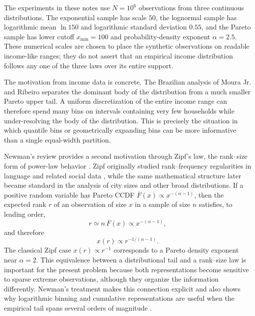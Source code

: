 \documentclass[12pt]{article}
\numberwithin{equation}{section}
\begin{document}
The experiments in these notes use $N=10^6$ observations from three continuous distributions. The exponential sample has scale $50$, the lognormal sample has logarithmic mean $\ln 150$ and logarithmic standard deviation $0.55$, and the Pareto sample has lower cutoff $x_{\min}=100$ and probability-density exponent $\alpha=2.5$. These numerical scales are chosen to place the synthetic observations on readable income-like ranges; they do not assert that an empirical income distribution follows any one of the three laws over its entire support.

The motivation from income data is concrete. The Brazilian analysis of Moura Jr. and Ribeiro \cite{MouraRibeiro2009} separates the dominant body of the distribution from a much smaller Pareto upper tail. A uniform discretization of the entire income range can therefore spend many bins on intervals containing very few households while under-resolving the body of the distribution. This is precisely the situation in which quantile bins or geometrically expanding bins can be more informative than a single equal-width partition.

Newman's review provides a second motivation through Zipf's law, the rank--size form of power-law behavior \cite{Newman2005}. Zipf originally studied rank--frequency regularities in language and related social data \cite{Zipf1949}, while the same mathematical structure later became standard in the analysis of city sizes and other broad distributions. If a positive random variable has Pareto CCDF $\overline F(x)\propto x^{-(\alpha-1)}$, then the expected rank $r$ of an observation of size $x$ in a sample of size $n$ satisfies, to leading order,
\begin{equation}
 r\simeq n\,\overline F(x)\propto x^{-(\alpha-1)},
\end{equation}
and therefore
\begin{equation}
 x(r)\propto r^{-1/(\alpha-1)}.
\end{equation}
The classical Zipf case $x(r)\propto r^{-1}$ corresponds to a Pareto density exponent near $\alpha=2$. This equivalence between a distributional tail and a rank--size law is important for the present problem because both representations become sensitive to sparse extreme observations, although they organize the information differently. Newman's treatment makes this connection explicit and also shows why logarithmic binning and cumulative representations are useful when the empirical tail spans several orders of magnitude \cite{Newman2005}.
\end{document}
